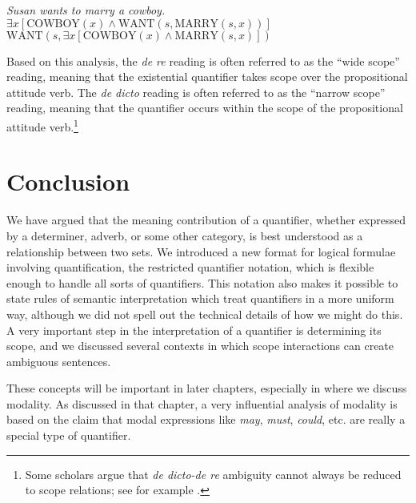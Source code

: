 \ea \label{ex:14.40}
\textit{Susan wants to marry a cowboy.}\\
\ea  $\exists x[\text{COWBOY}(x) \wedge \text{WANT}(s, \text{MARRY}(s,x))]$\\
\ex  $\text{WANT}(s, \exists x[\text{COWBOY}(x) \wedge \text{MARRY}(s,x)])$
                       \z
\z


Based on this analysis, the \textit{de re} reading is often referred to as the “wide scope” reading, meaning that the existential quantifier takes scope over the propositional attitude verb. The \textit{de dicto} reading is often referred to as the “narrow scope” reading, meaning that the quantifier occurs within the scope of the propositional attitude verb.\footnote{Some scholars argue that \textit{de dicto-de re} ambiguity cannot always be reduced to scope relations; see for example \citet{FodorSag1982}.}


\section{Conclusion}\label{sec:14.6}

We have argued that the meaning contribution of a quantifier, whether expressed by a determiner, adverb, or some other category, is best understood as a relationship between two sets. We introduced a new format for logical formulae involving quantification, the restricted quantifier notation, which is flexible enough to handle all sorts of quantifiers. This notation also makes it possible to state rules of semantic interpretation which treat quantifiers in a more uniform way, although we did not spell out the technical details of how we might do this. A very important step in the interpretation of a quantifier is determining its scope, and we discussed several contexts in which scope interactions can create ambiguous sentences.



These concepts will be important in later chapters, especially in  where we discuss modality. As discussed in that chapter, a very influential analysis of modality is based on the claim that modal expressions like \textit{may}, \textit{must}, \textit{could}, etc. are really a special type of quantifier.



